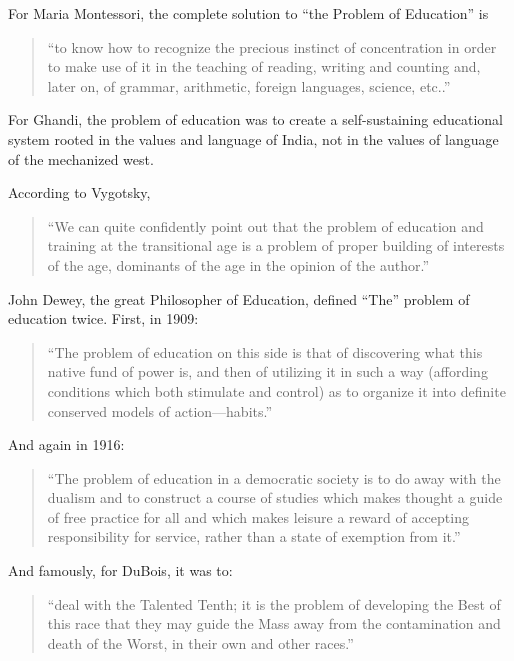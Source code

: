 For Maria Montessori, the complete solution to ``the Problem of Education'' is 

\begin{quote}

``to know how to recognize the precious instinct of concentration in order to make use of it in the teaching of reading, writing and counting and, later on, of grammar, arithmetic, foreign languages, science, etc..'' ~\citep{Montessori:1941ux}
\end{quote}

For Ghandi, the problem of education was to create a self-sustaining educational system rooted in the values and language of India, not in the values of language of the mechanized west. ~\citep{Gandhi:1962wj}

According to Vygotsky, 

\begin{quote}

``We can quite confidently point out that the problem of education and training at the transitional age is a problem of proper building of interests of the age, dominants of the age in the opinion of the author.'' ~\citep[p. 24]{Vygotsky:1998vw}
\end{quote}

John Dewey, the great Philosopher of Education, defined ``The'' problem of education twice. First, in 1909: 

\begin{quote}

``The problem of education on this side is that of discovering what this native fund of power is, and then of utilizing it in such a way (affording conditions which both stimulate and control) as to organize it into definite conserved models of action---habits.'' ~\citep[p. 50]{Dewey:1909tw}
\end{quote}

And again in 1916:

\begin{quote}

``The problem of education in a democratic society is to do away with the dualism and to construct a course of studies which makes thought a guide of free practice for all and which makes leisure a reward of accepting responsibility for service, rather than a state of exemption from it.'' ~\citep[Ch 19]{Dewey:1916tl}
\end{quote}

And famously, for DuBois, it was to: 

\begin{quote}

``deal with the Talented Tenth; it is the problem of developing the Best of this race that they may guide the Mass away from the contamination and death of the Worst, in their own and other races.'' ~\citep{DuBois:1903vh}
\end{quote}

